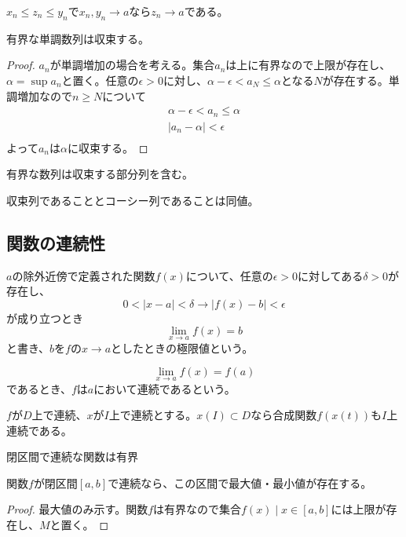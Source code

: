 	\begin{thm}[はさみうちの原理]
		$x_n \leq z_n \leq y_n$で$x_n, y_n \to a$なら$z_n \to a$である。
	\end{thm}

	\begin{thm}[有界単調数列の収束定理]
		有界な単調数列は収束する。
	\end{thm}
	\begin{proof}
		${a_n}$が単調増加の場合を考える。集合${a_n}$は上に有界なので上限が存在し、$\alpha = \sup{a_n}$と置く。任意の$\epsilon > 0$に対し、$\alpha - \epsilon < a_N \leq \alpha$となる$N$が存在する。単調増加なので$n \geq N$について
		\begin{align*}
			\alpha - \epsilon < a_n \leq \alpha\\
			|a_n - \alpha| < \epsilon\\
		\end{align*}
		よって${a_n}$は$\alpha$に収束する。
	\end{proof}

	\begin{thm}
		有界な数列は収束する部分列を含む。
	\end{thm}

	\begin{prop}
		収束列であることとコーシー列であることは同値。
	\end{prop}

\subsection{関数の連続性}
	\begin{dfn}
		$a$の除外近傍で定義された関数$f(x)$について、任意の$\epsilon > 0$に対してある$\delta > 0$が存在し、
			\[0 < |x - a| < \delta \rightarrow |f(x) - b| < \epsilon\]
		が成り立つとき
			\[\lim_{x \to a} f(x) = b\]
		と書き、$b$を$f$の$x \to a$としたときの極限値という。
	\end{dfn}
	\begin{dfn}[関数の連続]
			\[\lim_{x \to a} f(x) = f(a)\]
		であるとき、$f$は$a$において連続であるという。
	\end{dfn}
	\begin{prop}[合成関数の連続性]
		$f$が$D$上で連続、$x$が$I$上で連続とする。$x(I) \subset D$なら合成関数$f(x(t))$も$I$上連続である。
	\end{prop}

	\begin{prop}
		閉区間で連続な関数は有界
	\end{prop}
	\begin{thm}
		関数$f$が閉区間$[a, b]$で連続なら、この区間で最大値・最小値が存在する。
	\end{thm}
	\begin{proof}
		最大値のみ示す。関数$f$は有界なので集合${f(x) \mid x \in [a, b]}$には上限が存在し、$M$と置く。
	\end{proof}

